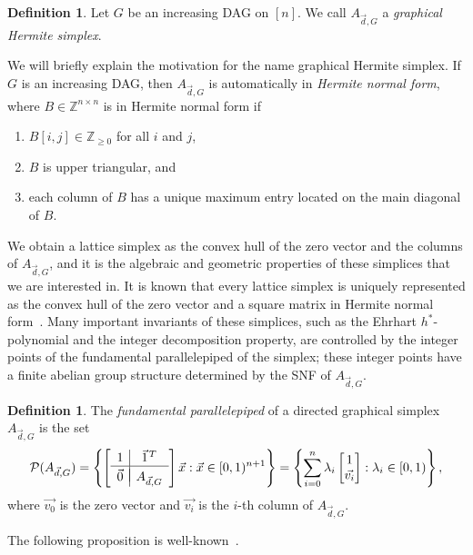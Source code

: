 \documentclass[12pt]{amsart}
\theoremstyle{definition}
\newtheorem{defn}[thm]{Definition}
\numberwithin{equation}{section}
\newcommand{\ring}[1]{\ensuremath{\mathbb{#1}}}
\renewcommand\>{\rangle}
\newcommand\<{\langle}
\newcommand\0{\mathbf{0}}
\newcommand\ZZ{\ring{Z}}
\newcommand\set[1]{\left\{#1\right\}}
\begin{document}
\begin{defn}\label{defn:GHS}
	Let $G$ be an increasing DAG on $[n]$.
	We call $A_{\vec{d}, G}$ a \emph{graphical Hermite simplex}.
\end{defn}

We will briefly explain the motivation for the name graphical Hermite simplex.
If $G$ is an increasing DAG, then $A_{\vec{d}, G}$ is automatically in \emph{Hermite normal form}, where $B \in \ZZ^{n\times n}$ is in Hermite normal form if
\begin{enumerate}
	\item $B[i,j] \in\ZZ_{\geq 0}$ for all $i$ and $j$,
	\item $B$ is upper triangular, and
	\item each column of $B$ has a unique maximum entry located on the main diagonal of $B$.
\end{enumerate} 

We obtain a lattice simplex as the convex hull of the zero vector and the columns of $A_{\vec{d}, G}$, and it is the algebraic and geometric properties of these simplices that we are interested in.
It is known that every lattice simplex is uniquely represented as the convex hull of the zero vector and a square matrix in Hermite normal form~\cite[Theorem 4.1~and~Corollary 4.2a]{schrijver}.
Many important invariants of these simplices, such as the Ehrhart $h^*$-polynomial and the integer decomposition property, are controlled by the integer points of the fundamental parallelepiped of the simplex; these integer points have a finite abelian group structure determined by the SNF of $A_{\vec{d} ,G}$.

\begin{defn}\label{defn:FP}
	The \emph{fundamental parallelepiped} of a directed graphical simplex $A_{\vec{d}, G}$ is the set
	\[\mathcal P(A_{\vec{d}, G}) = \set{\left[\begin{array}{c|c}
			1 & \vec{1} \hspace{0.3mm}\phantom{}^T\\
			\hline\\[-1em]
			\vec{0} & A_{\vec{d}, G}
		\end{array}\right]\vec{x}  : \vec{x} \in [0,1)^{n+1}} = \set{\sum_{i=0}^n \lambda_i \begin{bmatrix}
			1 \\ \vec{v_i}
		\end{bmatrix}  : \lambda_i \in [0,1) },\]
	where $\vec{v_0}$ is the zero vector and $\vec{v_i}$ is the $i$-th column of $A_{\vec{d}, G}$.
\end{defn} 
The following proposition is well-known~\cite{stanleysnfcomb}.
\end{document}
